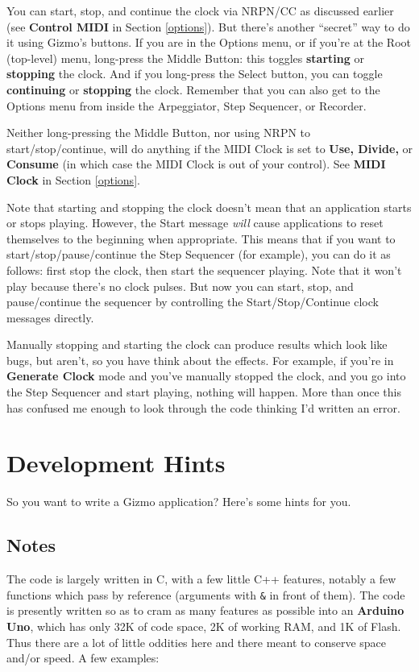 \documentclass{article}
\begin{document}
		You can start, stop, and continue the clock via NRPN/CC as discussed earlier (see {\bf Control MIDI} in Section \ref{options}).   But there's another ``secret'' way to do it using Gizmo's buttons.  If you are in the Options menu, or if you're at the Root (top-level) menu, long-press the Middle Button: this toggles {\bf starting} or {\bf stopping} the clock.  And if you long-press the Select button, you can toggle {\bf continuing} or {\bf stopping} the clock.  Remember that you can also get to the Options menu from inside the Arpeggiator, Step Sequencer, or Recorder.
		
		Neither long-pressing the Middle Button, nor using NRPN to start/stop/continue, will do anything if the MIDI Clock is set to {\bf Use, Divide,} or {\bf Consume} (in which case the MIDI Clock is out of your control).  See {\bf MIDI Clock} in Section \ref{options}.
				
		Note that starting and stopping the clock doesn't mean that an application starts or stops playing.  However, the Start message {\it will} cause applications to reset themselves to the beginning when appropriate.   This means that if you want to start/stop/pause/continue the Step Sequencer (for example), you can do it as follows: first stop the clock, then start the sequencer playing.  Note that it won't play because there's no clock pulses.  But now you can start, stop, and pause/continue the sequencer by controlling the Start/Stop/Continue clock messages directly.
		
		Manually stopping and starting the clock can produce results which look like bugs, but aren't, so you have think about the effects.  For example, if you're in {\bf Generate Clock} mode and you've manually stopped the clock, and you go into the Step Sequencer and start playing, nothing will happen. More than once this has confused me enough to look through the code thinking I'd written an error.
		

\section{Development Hints}

So you want to write a Gizmo application?  Here's some hints for you.

\subsection{Notes}

The code is largely written in C, with a few little C++ features, notably
a few functions which pass by reference (arguments with \texttt{\&} in front of them).  The
code is presently written so as to cram as many features as possible into an
{\bf Arduino Uno}, which has only 32K of code space, 2K of working RAM, and 1K of Flash.  
Thus there are a lot of little oddities here and there meant to conserve space and/or
speed.  A few examples:
\end{document}
